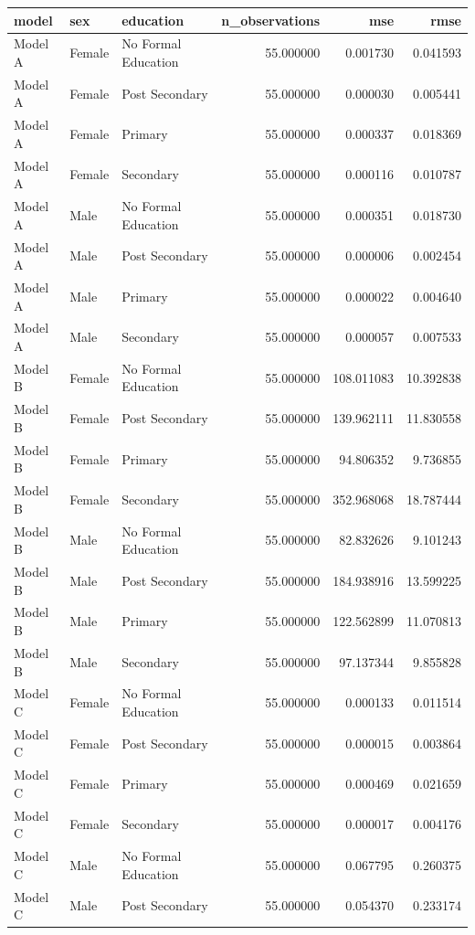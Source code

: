 \begin{table}[ht]
\centering
\begin{tabular}{lllrrr}
\hline
model & sex & education & n_observations & mse & rmse \\
\hline
Model A & Female & No Formal Education & 55.000000 & 0.001730 & 0.041593 \\
Model A & Female & Post Secondary & 55.000000 & 0.000030 & 0.005441 \\
Model A & Female & Primary & 55.000000 & 0.000337 & 0.018369 \\
Model A & Female & Secondary & 55.000000 & 0.000116 & 0.010787 \\
Model A & Male & No Formal Education & 55.000000 & 0.000351 & 0.018730 \\
Model A & Male & Post Secondary & 55.000000 & 0.000006 & 0.002454 \\
Model A & Male & Primary & 55.000000 & 0.000022 & 0.004640 \\
Model A & Male & Secondary & 55.000000 & 0.000057 & 0.007533 \\
Model B & Female & No Formal Education & 55.000000 & 108.011083 & 10.392838 \\
Model B & Female & Post Secondary & 55.000000 & 139.962111 & 11.830558 \\
Model B & Female & Primary & 55.000000 & 94.806352 & 9.736855 \\
Model B & Female & Secondary & 55.000000 & 352.968068 & 18.787444 \\
Model B & Male & No Formal Education & 55.000000 & 82.832626 & 9.101243 \\
Model B & Male & Post Secondary & 55.000000 & 184.938916 & 13.599225 \\
Model B & Male & Primary & 55.000000 & 122.562899 & 11.070813 \\
Model B & Male & Secondary & 55.000000 & 97.137344 & 9.855828 \\
Model C & Female & No Formal Education & 55.000000 & 0.000133 & 0.011514 \\
Model C & Female & Post Secondary & 55.000000 & 0.000015 & 0.003864 \\
Model C & Female & Primary & 55.000000 & 0.000469 & 0.021659 \\
Model C & Female & Secondary & 55.000000 & 0.000017 & 0.004176 \\
Model C & Male & No Formal Education & 55.000000 & 0.067795 & 0.260375 \\
Model C & Male & Post Secondary & 55.000000 & 0.054370 & 0.233174 \\

\end{tabular}
\end{table}
